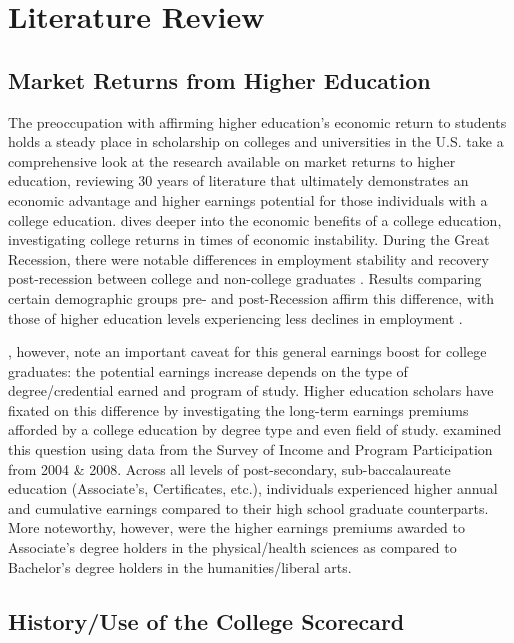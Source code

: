 \documentclass[a4paper, 12pt]{article}
\begin{document}
\section*{Literature Review}

\subsection*{Market Returns from Higher Education}

The preoccupation with affirming higher education's economic return to students holds a steady place in scholarship on colleges and universities in the U.S. \textcite{Oreopoulous_Petronijevic_2013} take a comprehensive look at the research available on market returns to higher education, reviewing 30 years of literature that ultimately demonstrates an economic advantage and higher earnings potential for those individuals with a college education. \textcite{hout_2012} dives deeper into the economic benefits of a college education, investigating college returns in times of economic instability. During the Great Recession, there were notable differences in employment stability and recovery post-recession between college and non-college graduates \parencite{hout_2012, hout_etal_2011ch}. Results comparing certain demographic groups pre- and post-Recession affirm this difference, with those of higher education levels experiencing less declines in employment \parencite{hoynesetal_2012}.  


\textcite{Carnevale_etal_2011}, however, note an important caveat for this general earnings boost for college graduates: the potential earnings increase depends on the type of degree/credential earned and program of study. Higher education scholars have fixated on this difference by investigating the long-term earnings premiums afforded by a college education by degree type and even field of study. \textcite{kimtamborini_2019} examined this question using data from the Survey of Income and Program Participation from 2004 \& 2008. Across all levels of post-secondary, sub-baccalaureate education (Associate's, Certificates, etc.), individuals experienced higher annual and cumulative earnings compared to their high school graduate counterparts. More noteworthy, however, were the higher earnings premiums awarded to Associate's degree holders in the physical/health sciences as compared to Bachelor's degree holders in the humanities/liberal arts.

\subsection*{History/Use of the College Scorecard}
\end{document}
